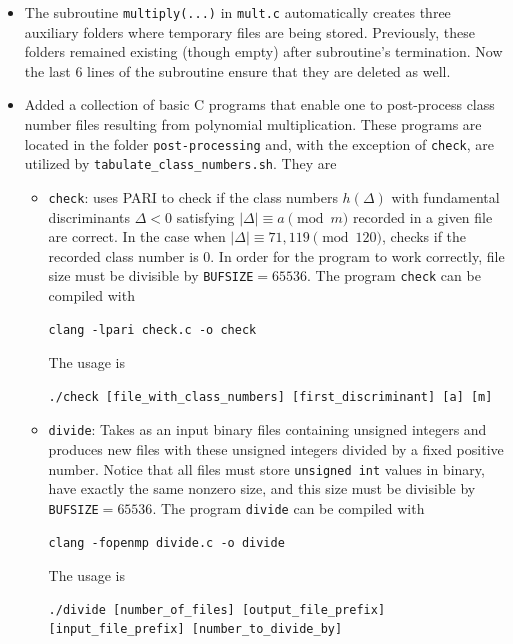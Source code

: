 \documentclass[a4paper,10pt]{article}
\newcommand{\code}{\lstinline}
\begin{document}
\begin{itemize}
\item The subroutine \code{multiply(...)} in \code{mult.c} automatically creates three auxiliary folders where temporary files are being stored. Previously, these folders remained existing (though empty) after subroutine's termination. Now the last 6 lines of the subroutine ensure that they are deleted as well.

\item Added a collection of basic C programs that enable one to post-process class number files resulting from polynomial multiplication. These programs are located in the folder \code{post-processing} and, with the exception of \code{check}, are utilized by \code{tabulate_class_numbers.sh}. They are

\begin{itemize}
\item \code{check}: uses PARI to check if the class numbers $h(\Delta)$ with fundamental discriminants $\Delta < 0$ satisfying $|\Delta| \equiv a \pmod m$ recorded in a given file are correct. In the case when $|\Delta| \equiv 71, 119 \pmod{120}$, checks if the recorded class number is $0$. In order for the program to work correctly, file size must be divisible by \code{BUFSIZE}$=65536$. The program \code{check} can be compiled with

\begin{verbatim}
clang -lpari check.c -o check
\end{verbatim}

The usage is

\begin{verbatim}
./check [file_with_class_numbers] [first_discriminant] [a] [m]
\end{verbatim}




\item \code{divide}: Takes as an input binary files containing unsigned integers and produces new files with these unsigned integers divided by a fixed positive number. Notice that all files must store \code{unsigned int} values in binary, have exactly the same nonzero size, and this size must be divisible by \code{BUFSIZE}$=65536$. The program \code{divide} can be compiled with

\begin{verbatim}
clang -fopenmp divide.c -o divide
\end{verbatim}

The usage is

\begin{verbatim}
./divide [number_of_files] [output_file_prefix] [input_file_prefix] [number_to_divide_by]
\end{verbatim}






\end{itemize}
\end{itemize}
\end{document}
